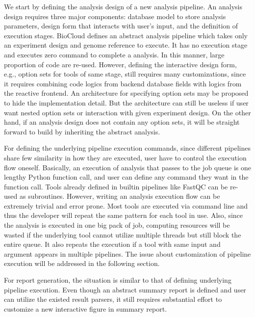 We start by defining the analysis design of a new analysis pipeline. An
analysis design requires three major components: database model to store
analysis parameters, design form that interacts with user's input, and the
definition of execution stages. BioCloud defines an abstract analysis pipeline
which takes only an experiment design and genome reference to execute. It has
no execution stage and executes zero command to complete a analysis. In this
manner, large proportion of code are re-used. However, defining the interactive
design form, e.g., option sets for tools of same stage, still requires many
customizations, since it requires combining code logics from backend database
fields with logics from the reactive frontend. An architecture for specifying
option sets may be proposed to hide the implementation detail. But the
architecture can still be useless if user want nested option sets or
interaction with given experiment design. On the other hand, if an analysis
design does not contain any option sets, it will be straight forward to build
by inheriting the abstract analysis.

For defining the underlying pipeline execution commands, since different
pipelines share few similarity in how they are executed, user have to control
the execution flow oneself. Basically, an execution of analysis that passes
to the job queue is one lengthy Python function call, and user can define any
command they want in the function call. Tools already defined in builtin
pipelines like FastQC can be re-used as subroutines. However, writing an
analysis execution flow can be extremely trivial and error prone. Most tools
are executed via command line and thus the developer will repeat the same
pattern for each tool in use. Also, since the analysis is executed in one big
pack of job, computing resources will be wasted if the underlying tool cannot
utilize multiple threads but still block the entire queue. It also repeats the
execution if a tool with same input and argument appears in multiple
pipelines. The issue about customization of pipeline execution will be
addressed in the following section.

For report generation, the situation is similar to that of defining underlying
pipeline execution. Even though an abstract summary report is defined and user
can utilize the existed result parsers, it still requires substantial effort to
customize a new interactive figure in summary report.




